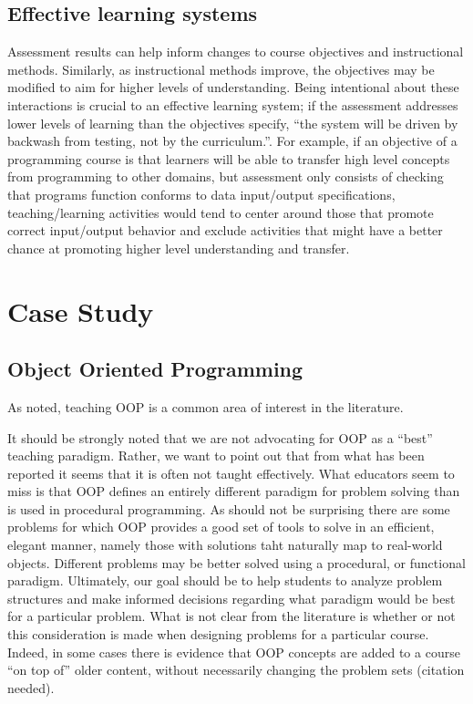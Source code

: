 \documentclass[12pt]{article}
\begin{document}
\subsection{Effective learning systems}\label{sec:effective-learning-systems}

Assessment results can help inform changes to course objectives and
instructional methods\autocite{felder_designing_2003}. Similarly, as
instructional methods improve, the objectives may be modified to aim
for higher levels of understanding. Being intentional about these
interactions is crucial to an effective learning system; if the
assessment addresses lower levels of learning than the objectives
specify, ``the system will be driven by backwash from testing, not by
the curriculum.''\autocite[][p. 350]{biggs_enhancing_1996}. For
example, if an objective of a programming course is that learners will
be able to transfer high level concepts from programming to other
domains, but assessment only consists of checking that programs
function conforms to data input/output specifications,
teaching/learning activities would tend to center around those that
promote correct input/output behavior and exclude activities that
might have a better chance at promoting higher level understanding and
transfer\autocite{biggs_enhancing_1996}.

\section{Case Study}
\subsection{Object Oriented Programming}
As noted, teaching OOP is a common area of interest in the literature. 

It should be strongly noted that we are not advocating for OOP as a
``best'' teaching paradigm. Rather, we want to point out that from what
has been reported it seems that it is often not taught
effectively. What educators seem to miss is that OOP defines an
entirely different paradigm for problem solving than is used in
procedural programming\autocite{kolling_problem_1999}. As should not
be surprising there are some problems for which OOP provides a good
set of tools to solve in an efficient, elegant manner, namely those
with solutions taht naturally map to real-world
objects\autocite{raymond_art_2003}. Different problems may be better
solved using a procedural, or functional
paradigm\autocite{kay_history_1996,felleisen_functional_2009,crestani_experience_2010}. Ultimately,
our goal should be to help students to analyze problem structures and
make informed decisions regarding what paradigm would be best for a
particular problem. What is not clear from the literature is whether
or not this consideration is made when designing problems for a
particular course. Indeed, in some cases there is evidence that OOP
concepts are added to a course ``on top of'' older content, without
necessarily changing the problem sets (citation needed).
\end{document}
